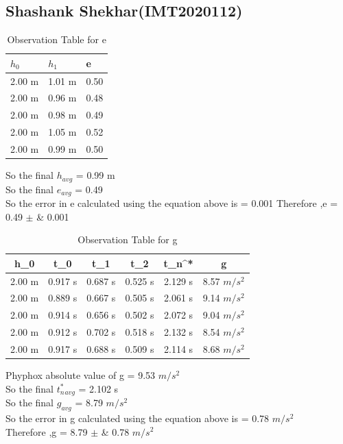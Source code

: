 \documentclass[11pt]{scrartcl} %
\begin{document}
\subsection{Shashank Shekhar(IMT2020112)}

\begin{table}[h] %
	\centering %
	\begin{tabular}{l l l}
		\toprule
		\textbf{$h_0$} & \textbf{$h_1$} & \textbf{e} \\
		\midrule
		2.00 m & 1.01 m & 0.50\\
        2.00 m & 0.96 m  & 0.48\\
        2.00 m & 0.98 m  & 0.49\\
        2.00 m & 1.05 m & 0.52 \\
        2.00 m & 0.99 m & 0.50 \\
		\bottomrule
	\end{tabular}
	\caption{Observation Table for e}
\end{table}
So the final $h_{avg}$ = 0.99 m\\
So the final $e_{avg}$ = 0.49\\
So the error in e calculated using the equation above is  = 0.001 \newline
Therefore ,e = 0.49  $\pm$ &  0.001 \\

\begin{table}[h]
\centering
\begin{tabular}{||c c c c c c||} 
\toprule
 \hline
 h_0 & t_0 & t_1 & t_2 & t_n^* & g \\ [0.5ex] 
 \midrule
 \hline\hline
 2.00 m & 0.917 s & 0.687 s  & 0.525 s & 2.129 s & 8.57 $m/s^2$  \\ 
 \hline
 2.00 m & 0.889 s & 0.667 s & 0.505 s & 2.061 s & 9.14 $m/s^2$  \\
 \hline 
 2.00 m & 0.914 s & 0.656 s & 0.502 s & 2.072 s  & 9.04 $m/s^2$   \\
 \hline
 2.00 m & 0.912 s & 0.702 s & 0.518 s & 2.132 s  & 8.54 $m/s^2$   \\
 \hline
 2.00 m & 0.917 s & 0.688 s & 0.509 s & 2.114 s  & 8.68 $m/s^2$  \\ 
 [1ex]
 \bottomrule
 \hline
\end{tabular}
\caption{Observation Table for g}
\end{table}
Phyphox absolute value of g = 9.53 $m/s^2$\\
So the final $t_n^*_{avg}$ = 2.102 s\\
So the final $g_{avg}$ = 8.79 $m/s^2$\\
So the error in g calculated using the equation above is  = 0.78 $m/s^2$\\
Therefore ,g = 8.79  $\pm$ &  0.78 $m/s^2$ \\
\newpage
\end{document}
